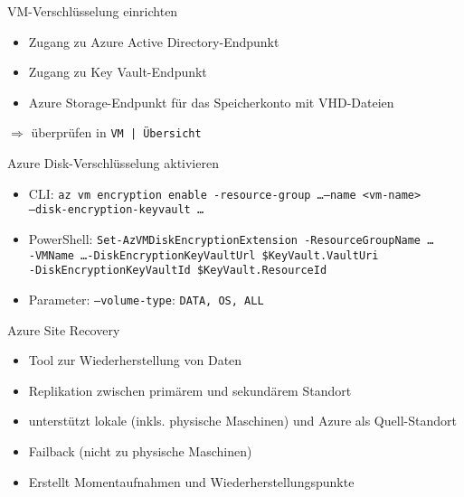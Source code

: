 \begin{flashcard}[Definition]{VM-Verschlüsselung einrichten}
    \begin{itemize}
        \item Zugang zu Azure Active Directory-Endpunkt
        \item Zugang zu Key Vault-Endpunkt
        \item Azure Storage-Endpunkt für das Speicherkonto mit VHD-Dateien
    \end{itemize}
    \vspace{1cm}
    $\Rightarrow$ überprüfen in \texttt{VM | Übersicht}
\end{flashcard}

\begin{flashcard}[Definition]{Azure Disk-Verschlüsselung aktivieren}
    \begin{itemize}
        \item CLI:\newline
            \texttt{az vm encryption enable -resource-group \ldots --name <vm-name>\\--disk-encryption-keyvault \ldots}
        \item PowerShell:\newline
            \texttt{Set-AzVMDiskEncryptionExtension -ResourceGroupName \ldots\\-VMName \ldots -DiskEncryptionKeyVaultUrl \$KeyVault.VaultUri\\-DiskEncryptionKeyVaultId \$KeyVault.ResourceId}
        \item Parameter: \texttt{--volume-type}: \texttt{DATA, OS, ALL}
    \end{itemize}
\end{flashcard}


\begin{flashcard}[Definition]{Azure Site Recovery}
    \begin{itemize}
        \item Tool zur Wiederherstellung von Daten
        \item Replikation zwischen primärem und sekundärem Standort
        \item unterstützt lokale (inkls. physische Maschinen) und Azure als Quell-Standort
        \item Failback (nicht zu physische Maschinen)
        \item Erstellt Momentaufnahmen und Wiederherstellungspunkte
    \end{itemize}
\end{flashcard}

